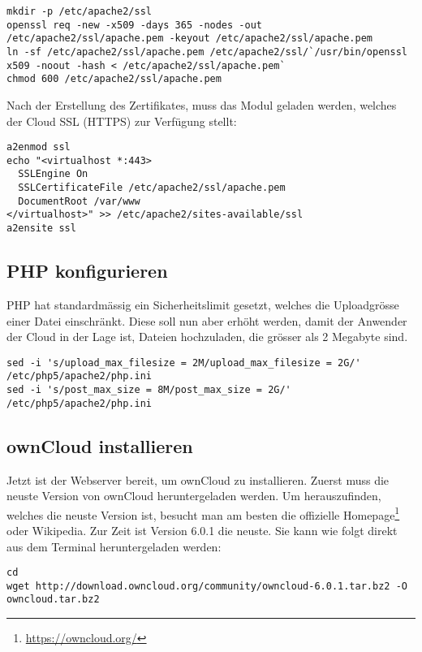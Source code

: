 \begin{lstlisting}
mkdir -p /etc/apache2/ssl
openssl req -new -x509 -days 365 -nodes -out /etc/apache2/ssl/apache.pem -keyout /etc/apache2/ssl/apache.pem
ln -sf /etc/apache2/ssl/apache.pem /etc/apache2/ssl/`/usr/bin/openssl x509 -noout -hash < /etc/apache2/ssl/apache.pem`
chmod 600 /etc/apache2/ssl/apache.pem
\end{lstlisting}


Nach der Erstellung des Zertifikates, muss das Modul geladen werden, welches der Cloud SSL (HTTPS) zur Verfügung stellt:

\begin{lstlisting}
a2enmod ssl
echo "<virtualhost *:443>
  SSLEngine On
  SSLCertificateFile /etc/apache2/ssl/apache.pem
  DocumentRoot /var/www
</virtualhost>" >> /etc/apache2/sites-available/ssl
a2ensite ssl
\end{lstlisting}


\subsection{PHP konfigurieren}
PHP hat standardmässig ein Sicherheitslimit gesetzt, welches die Uploadgrösse einer Datei einschränkt. Diese soll nun aber erhöht werden, damit der Anwender der Cloud in der Lage ist, Dateien hochzuladen, die grösser als 2 Megabyte sind.

\begin{lstlisting}
sed -i 's/upload_max_filesize = 2M/upload_max_filesize = 2G/' /etc/php5/apache2/php.ini
sed -i 's/post_max_size = 8M/post_max_size = 2G/' /etc/php5/apache2/php.ini
\end{lstlisting}

\subsection{ownCloud installieren}
Jetzt ist der Webserver bereit, um ownCloud zu installieren. Zuerst muss die neuste Version von ownCloud heruntergeladen werden. Um herauszufinden, welches die neuste Version ist, besucht man am besten die offizielle Homepage\footnote{\url{https://owncloud.org/}} oder Wikipedia. Zur Zeit ist Version 6.0.1 die neuste. Sie kann wie folgt direkt aus dem Terminal heruntergeladen werden:

\begin{lstlisting}
cd
wget http://download.owncloud.org/community/owncloud-6.0.1.tar.bz2 -O owncloud.tar.bz2
\end{lstlisting}


